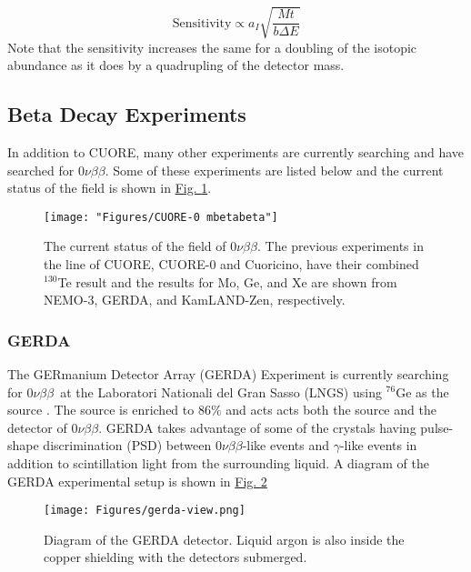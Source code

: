 \documentclass[12pt,a4paper]{article}
\newcommand{\zeronubb}{$0\nu \beta \beta$}
\begin{document}
\begin{equation}
\textrm{Sensitivity} \propto a_I \sqrt{\frac{Mt}{b\Delta E}}
\end{equation}
Note that the sensitivity increases the same for a doubling of the isotopic abundance as it does by a quadrupling of the detector mass.


\subsection{Beta Decay Experiments} \label{sec:zeronubb_Experiments}

In addition to CUORE, many other experiments are currently searching and have searched for \zeronubb. Some of these experiments are listed below and the current status of the field is shown in \hyperref[fig:cuore-0-mbetabeta]{Fig. \ref*{fig:cuore-0-mbetabeta}}.


\begin{figure}[htbp]
\centering
\texttt{[image: "Figures/CUORE-0 mbetabeta"]}
\caption{The current status of the field of \zeronubb. The previous experiments in the line of CUORE, CUORE-0 and Cuoricino, have their combined $^{130}$Te result and the results for Mo, Ge, and Xe are shown from NEMO-3, GERDA, and KamLAND-Zen, respectively.}
\label{fig:cuore-0-mbetabeta}
\end{figure}


\subsubsection*{GERDA}

The GERmanium Detector Array (GERDA) Experiment is currently searching for \zeronubb~at the Laboratori Nationali del Gran Sasso (LNGS) using $^{76}$Ge as the source \cite{Agostini:2016iid}. The source is enriched to $86\%$ and acts acts both the source and the detector of \zeronubb. GERDA takes advantage of some of the crystals having pulse-shape discrimination (PSD) between \zeronubb-like events and $\gamma$-like events in addition to scintillation light from the surrounding liquid. A diagram of the GERDA experimental setup is shown in \hyperref[fig:gerda-labelled]{Fig. \ref*{fig:gerda-labelled}}

\begin{figure}[tbph]
\centering
\texttt{[image: Figures/gerda-view.png]}
\caption{Diagram of the GERDA detector. Liquid argon is also inside the copper shielding with the detectors submerged.}
\label{fig:gerda-labelled}
\end{figure}
\end{document}
